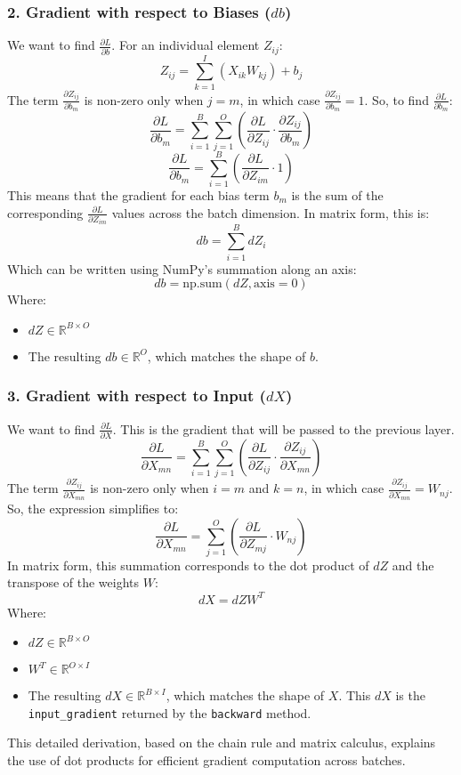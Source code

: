 \documentclass{article}
\begin{document}
\subsubsection*{2. Gradient with respect to Biases ($db$)}
We want to find $\frac{\partial L}{\partial b}$.
For an individual element $Z_{ij}$:
$$ Z_{ij} = \sum_{k=1}^{I} (X_{ik} W_{kj}) + b_j $$
The term $\frac{\partial Z_{ij}}{\partial b_m}$ is non-zero only when $j = m$, in which case $\frac{\partial Z_{ij}}{\partial b_m} = 1$.
So, to find $\frac{\partial L}{\partial b_m}$:
$$ \frac{\partial L}{\partial b_m} = \sum_{i=1}^{B} \sum_{j=1}^{O} \left( \frac{\partial L}{\partial Z_{ij}} \cdot \frac{\partial Z_{ij}}{\partial b_m} \right) $$
$$ \frac{\partial L}{\partial b_m} = \sum_{i=1}^{B} \left( \frac{\partial L}{\partial Z_{im}} \cdot 1 \right) $$
This means that the gradient for each bias term $b_m$ is the sum of the corresponding $\frac{\partial L}{\partial Z_{im}}$ values across the batch dimension.
In matrix form, this is:
$$ db = \sum_{i=1}^{B} dZ_i $$
Which can be written using NumPy's summation along an axis:
$$ db = \text{np.sum}(dZ, \text{axis}=0) $$
Where:
\begin{itemize}
    \item $dZ \in \mathbb{R}^{B \times O}$
    \item The resulting $db \in \mathbb{R}^{O}$, which matches the shape of $b$.
\end{itemize}

\subsubsection*{3. Gradient with respect to Input ($dX$)}
We want to find $\frac{\partial L}{\partial X}$. This is the gradient that will be passed to the previous layer.
$$ \frac{\partial L}{\partial X_{mn}} = \sum_{i=1}^{B} \sum_{j=1}^{O} \left( \frac{\partial L}{\partial Z_{ij}} \cdot \frac{\partial Z_{ij}}{\partial X_{mn}} \right) $$
The term $\frac{\partial Z_{ij}}{\partial X_{mn}}$ is non-zero only when $i = m$ and $k = n$, in which case $\frac{\partial Z_{ij}}{\partial X_{mn}} = W_{nj}$.
So, the expression simplifies to:
$$ \frac{\partial L}{\partial X_{mn}} = \sum_{j=1}^{O} \left( \frac{\partial L}{\partial Z_{mj}} \cdot W_{nj} \right) $$
In matrix form, this summation corresponds to the dot product of $dZ$ and the transpose of the weights $W$:
$$ dX = dZ W^T $$
Where:
\begin{itemize}
    \item $dZ \in \mathbb{R}^{B \times O}$
    \item $W^T \in \mathbb{R}^{O \times I}$
    \item The resulting $dX \in \mathbb{R}^{B \times I}$, which matches the shape of $X$. This $dX$ is the \texttt{input_gradient} returned by the \texttt{backward} method.
\end{itemize}

This detailed derivation, based on the chain rule and matrix calculus, explains the use of dot products for efficient gradient computation across batches.
\end{document}
